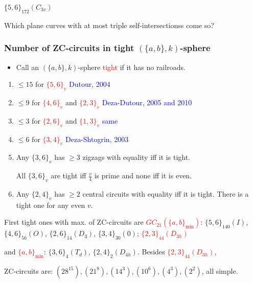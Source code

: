 \documentclass{beamer}
\begin{document}
\begin{frame}
\begin{center}
\begin{minipage}{4.5cm}
$\{5,6\}_{172}(C_{3v})$
\end{minipage}
\end{center}
Which plane curves with at most triple self-intersectionss come 
so?
\end{frame}


\begin{frame}\frametitle{Number of ZC-circuits in tight $(\{a,b\},k)$-sphere}
\vspace{-2.5mm}
\begin{itemize}
\item 
Call an $(\{a,b\},k)$-sphere \textcolor{red}{tight}  if it has no
railroads.
\end{itemize}

\begin{enumerate}

\item[\ding{108}] $\le 15$ for \textcolor{red}{$\{5,6\}_v$} \textcolor{blue}{Dutour, 2004} 
\item[\ding{108}] $\le 9$ for \textcolor{red}{$\{4,6\}_v$} and \textcolor{red}{$\{2,3\}_v$}
\textcolor{blue}{Deza-Dutour, 2005 and 2010} 
\item[\ding{108}] $\le 3$ for  \textcolor{red}{$\{2, 6\}_v$} and  \textcolor{red}{$\{1, 3\}_v$}
\textcolor{blue}{same}
\item[\ding{108}] $\le 6$ for \textcolor{red}{$\{3, 4\}_v$}
\textcolor{blue}{Deza-Shtogrin, 2003}
\item[\ding{108}] Any $\{3,6\}_v$ has $\geq 3$ zigzags with equality iff it is 
tight.

All $\{3,6\}_v$
are tight iff $\frac{v}{4}$ is prime and none iff it is even.
\item[\ding{108}] Any $\{2,4\}_v$ has $\geq 2$ central circuits with equality iff 
it is 
tight.
There is a tight one for any even $v$.


\end{enumerate}
\pause

First tight ones with max.   of ZC-circuits are 
\textcolor{red}{$GC_{21}(\{a,b\}_{\min})$}: $\{5,6\}_{140}(I)$,
$\{4,6\}_{56}(O)$, $\{2,6\}_{14}(D_3)$, $\{3,4\}_{30}(0)$; 
\textcolor{red}{$\{2,3\}_{44}(D_{3h})$} 

and \textcolor{red}{$\{a,b\}_{\min}$}: $\{3,6\}_{4}(T_d)$, 
$\{2,4\}_{2}(D_{4h})$. Besides \textcolor{red}{$\{2,3\}_{44}(D_{3h})$},


ZC-circuits  are: $(28^{15}),(21^{8}), (14^3), (10^6), (4^3), (2^2)$, all 
simple.

\end{frame}
\end{document}
